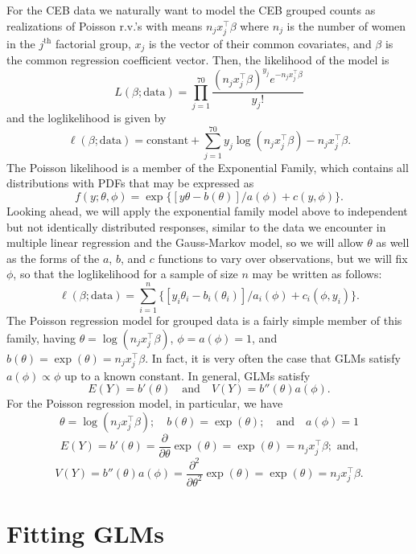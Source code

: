 \documentclass[
]{book}
\begin{document}
For the CEB data we naturally want to model the CEB grouped counts as realizations of Poisson r.v.'s with means \(n_{j}x^\top_j\beta\) where \(n_j\) is the number of women in the \(j^{\text{th}}\) factorial group, \(x_j\) is the vector of their common covariates, and \(\beta\) is the common regression coefficient vector. Then, the likelihood of the model is
\[L(\beta;\text{data}) = \prod_{j=1}^{70}\frac{(n_{j}x^\top_j\beta)^{y_j}e^{-n_{j}x^\top_j\beta}}{y_j!}\]
and the loglikelihood is given by
\[\ell(\beta;\text{data}) = \text{constant} + \sum_{j=1}^{70}y_j\log(n_{j}x^\top_j\beta) - n_{j}x^\top_j\beta.\]
The Poisson likelihood is a member of the Exponential Family, which contains all distributions with PDFs that may be expressed as
\[f(y;\theta,\phi) = \exp\{[y\theta - b(\theta)]/a(\phi) + c(y,\phi)\}.\]
Looking ahead, we will apply the exponential family model above to independent but not identically distributed responses, similar to the data we encounter in multiple linear regression and the Gauss-Markov model, so we will allow \(\theta\) as well as the forms of the \(a\), \(b\), and \(c\) functions to vary over observations, but we will fix \(\phi\), so that the loglikelihood for a sample of size \(n\) may be written as follows:
\[\ell(\beta;\text{data}) = \sum_{i=1}^n \{[y_i\theta_i - b_i(\theta_i)]/a_i(\phi) + c_i(\phi, y_i)\}.\]
The Poisson regression model for grouped data is a fairly simple member of this family, having \(\theta = \log (n_{j}x^\top_j\beta)\), \(\phi = a(\phi) = 1\), and \(b(\theta) = \exp(\theta) =n_{j}x^\top_j\beta\). In fact, it is very often the case that GLMs satisfy \(a(\phi)\propto \phi\) up to a known constant.
In general, GLMs satisfy
\[E(Y) = b'(\theta) \quad \text{and}\quad V(Y) = b''(\theta)a(\phi).\]
For the Poisson regression model, in particular, we have
\[\theta = \log(n_{j}x^\top_j\beta); \quad b(\theta) = \exp(\theta); \quad \text{and}\quad a(\phi) = 1\]
\[E(Y) = b'(\theta) = \frac{\partial}{\partial \theta}\exp(\theta) = \exp(\theta) = n_{j}x^\top_j\beta; \text{ and,}\]
\[V(Y) = b''(\theta)a(\phi) = \frac{\partial^2}{\partial \theta^2}\exp(\theta) = \exp(\theta) = n_{j}x^\top_j\beta.\]

\hypertarget{fitting-glms}{%
\section{Fitting GLMs}\label{fitting-glms}}
\end{document}
